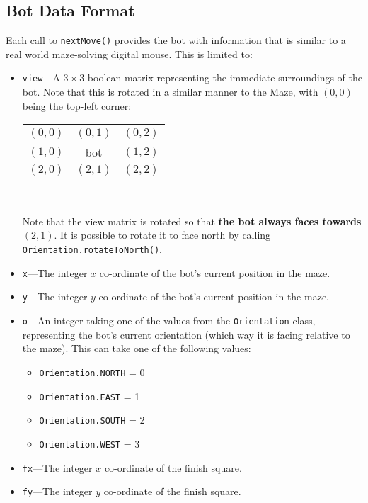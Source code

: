 \documentclass[11pt]{article}
\begin{document}
\subsection{Bot Data Format}
\label{section:dataformat}
Each call to \texttt{nextMove()} provides the bot with information that is similar to a real world maze-solving digital mouse.  This is limited to:
\begin{itemize}
\item \texttt{view}---A $3 \times 3$ boolean matrix representing the immediate surroundings of the bot.  Note that this is rotated in a similar manner to the Maze, with $(0,0)$ being the top-left corner:\\
        \begin{center}
        \begin{tabular}{|c|c|c|}
            \hline
            $(0,0)$ & $(0,1)$ & $(0,2)$ \\ \hline
            $(1,0)$ & bot     & $(1,2)$ \\ \hline
            $(2,0)$ & $(2,1)$ & $(2,2)$ \\ \hline
        \end{tabular}\\
        \end{center}
        \vspace{12pt}
        Note that the view matrix is rotated so that \textbf{the bot always faces towards $(2,1)$}.  It is possible to rotate it to face north by calling \texttt{Orientation.rotateToNorth()}.

\item \texttt{x}---The integer $x$ co-ordinate of the bot's current position in the maze.
\item \texttt{y}---The integer $y$ co-ordinate of the bot's current position in the maze.

\item \texttt{o}---An integer taking one of the values from the \texttt{Orientation} class, representing the bot's current orientation (which way it is facing relative to the maze).  This can take one of the following values:
    \begin{itemize}
    \item \texttt{Orientation.NORTH} = 0
    \item \texttt{Orientation.EAST} = 1 
    \item \texttt{Orientation.SOUTH} = 2
    \item \texttt{Orientation.WEST} = 3
    \end{itemize}

\item \texttt{fx}---The integer $x$ co-ordinate of the finish square.
\item \texttt{fy}---The integer $y$ co-ordinate of the finish square.
\end{itemize}
\end{document}
